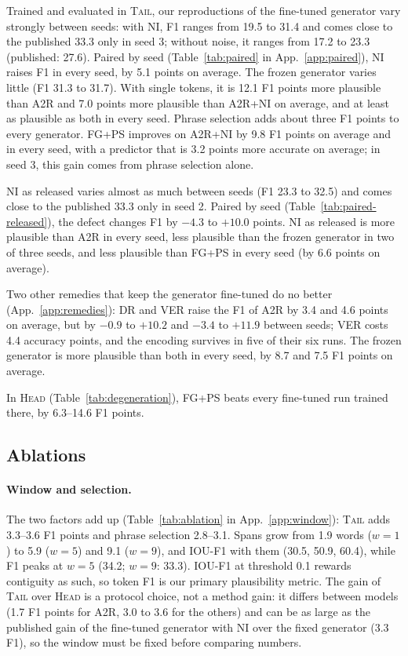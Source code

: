 \documentclass[11pt]{article}
\newcommand{\HEAD}{\textup{\textsc{Head}}}
\newcommand{\TAIL}{\textup{\textsc{Tail}}}
\begin{document}
Trained and evaluated in \TAIL, our reproductions of the fine-tuned generator vary strongly between seeds: with NI, F1 ranges from 19.5 to 31.4 and comes close to the published 33.3 only in seed 3; without noise, it ranges from 17.2 to 23.3 (published: 27.6). Paired by seed (Table~\ref{tab:paired} in App.~\ref{app:paired}), NI raises F1 in every seed, by 5.1 points on average. The frozen generator varies little (F1 31.3 to 31.7). With single tokens, it is 12.1 F1 points more plausible than A2R and 7.0 points more plausible than A2R+NI on average, and at least as plausible as both in every seed. Phrase selection adds about three F1 points to every generator. FG+PS improves on A2R+NI by 9.8 F1 points on average and in every seed, with a predictor that is 3.2 points more accurate on average; in seed 3, this gain comes from phrase selection alone.

NI as released varies almost as much between seeds (F1 23.3 to 32.5) and comes close to the published 33.3 only in seed 2. Paired by seed (Table~\ref{tab:paired-released}), the defect changes F1 by $-4.3$ to $+10.0$ points. NI as released is more plausible than A2R in every seed, less plausible than the frozen generator in two of three seeds, and less plausible than FG+PS in every seed (by 6.6 points on average).

Two other remedies that keep the generator fine-tuned do no better (App.~\ref{app:remedies}): DR and VER raise the F1 of A2R by 3.4 and 4.6 points on average, but by $-0.9$ to $+10.2$ and $-3.4$ to $+11.9$ between seeds; VER costs 4.4 accuracy points, and the encoding survives in five of their six runs. The frozen generator is more plausible than both in every seed, by 8.7 and 7.5 F1 points on average.

In \HEAD{} (Table~\ref{tab:degeneration}), FG+PS beats every fine-tuned run trained there, by 6.3--14.6 F1 points.

\subsection{Ablations}
\label{sec:ablations}

\paragraph{Window and selection.}
The two factors add up (Table~\ref{tab:ablation} in App.~\ref{app:window}): \TAIL{} adds 3.3--3.6 F1 points and phrase selection 2.8--3.1. Spans grow from 1.9 words ($w = 1$) to 5.9 ($w = 5$) and 9.1 ($w = 9$), and IOU-F1 with them (30.5, 50.9, 60.4), while F1 peaks at $w = 5$ (34.2; $w = 9$: 33.3). IOU-F1 at threshold 0.1 rewards contiguity as such, so token F1 is our primary plausibility metric. The gain of \TAIL{} over \HEAD{} is a protocol choice, not a method gain: it differs between models (1.7 F1 points for A2R, 3.0 to 3.6 for the others) and can be as large as the published gain of the fine-tuned generator with NI over the fixed generator (3.3 F1), so the window must be fixed before comparing numbers.
\end{document}
